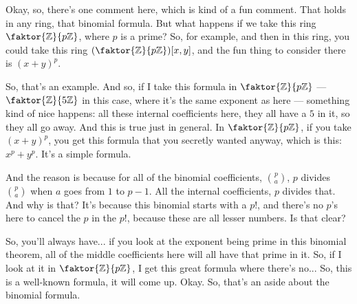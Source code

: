 \begin{speech}[00:03:48 - 00:05:44]
Okay, so, there's one comment here, which is kind of a fun comment. That holds in any ring, that binomial formula. But what happens if we take this ring $\faktor{\mathbb{Z}}{p\mathbb{Z}}$,  where $p$ is a prime?  So, for example, and then in this ring, you could take this ring $(\faktor{\mathbb{Z}}{p\mathbb{Z}})[x, y]$, and the fun thing to consider there is $(x+y)^p$. 

So, that's an example. And so, if I take this formula in $\faktor{\mathbb{Z}}{p\mathbb{Z}}$ --- $\faktor{\mathbb{Z}}{5\mathbb{Z}}$ in this case, where it's the same exponent as here --- something kind of nice happens: all these internal coefficients here, they all have a $5$ in it, so they all go away. And this is true just in general. In $\faktor{\mathbb{Z}}{p\mathbb{Z}}$, if you take $(x+y)^p$, you get this formula that you secretly wanted anyway, which is this:  $x^p + y^p$. It's a simple formula.

And the reason is because for all of the binomial coefficients, $\binom{p}{a}$, $p$ divides $\binom{p}{a}$  when $a$ goes from $1$ to $p-1$.  All the internal coefficients, $p$ divides that. And why is that? It's because this binomial starts with a $p!$,  and there's no $p$'s here to cancel the $p$ in the $p!$, because these are all lesser numbers. Is that clear? 

So, you'll always have... if you look at the exponent being prime in this binomial theorem, all of the middle coefficients here will all have that prime in it. So, if I look at it in $\faktor{\mathbb{Z}}{p\mathbb{Z}}$, I get this great formula where there's no... So, this is a well-known formula, it will come up. Okay. So, that's an aside about the binomial formula.
\end{speech}

